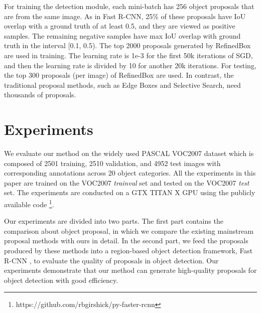 \documentclass[letterpaper]{article} %
\begin{document}
For training the detection module, each mini-batch has 256 object proposals that
are from the same image.
As in Fast R-CNN, 25\% of these proposals have IoU overlap with a ground truth
of at least 0.5, and they are viewed as positive samples.
The remaining negative samples have max IoU overlap with ground truth
in the interval [0.1, 0.5).
The top 2000 proposals generated by RefinedBox are used in training.
The learning rate is 1e-3 for the first 50k iterations of SGD,
and then the learning rate is divided by 10 for another 20k iterations.
For testing, the top 300 proposals (per image) of RefinedBox are used.
In contrast, the traditional proposal methods, such as Edge Boxes and
Selective Search, need thousands of proposals.



\section{Experiments}
We evaluate our method on the widely used PASCAL VOC2007 dataset
\cite{pascal-voc-2007} which is composed of 2501 training, 2510 validation, and
4952 test images with corresponding annotations across 20 object categories.
All the experiments in this paper are trained on the VOC2007 \textit{trainval}
set and tested on the VOC2007 \textit{test} set.
The experiments are conducted on a GTX TITAN X GPU using the publicly
available code \footnote{https://github.com/rbgirshick/py-faster-rcnn}.


Our experiments are divided into two parts.
The first part contains the comparison about object proposal, in which we
compare the existing mainstream proposal methods with ours in detail.
In the second part, we feed the proposals produced by these methods into a
region-based object detection framework, Fast R-CNN \cite{girshick2015fast},
to evaluate the quality of proposals in object detection.
Our experiments demonstrate that our method can generate high-quality
proposals for object detection with good efficiency.
\end{document}
